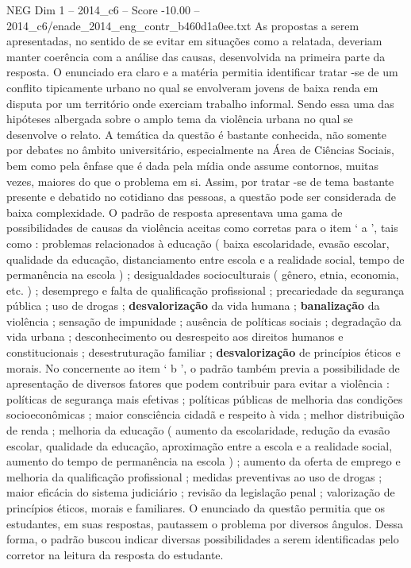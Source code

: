 \begin{textsample}{NEG Dim 1 – 2014\_c6 – Score -10.00 – 2014\_c6/enade\_2014\_eng\_contr\_b460d1a0ee.txt}
As propostas a serem apresentadas, no sentido de se evitar em situações como a relatada, deveriam manter coerência com a análise das causas, desenvolvida na primeira parte da resposta.
O enunciado era claro e a matéria permitia identificar tratar -se de um conflito tipicamente urbano no qual se envolveram jovens de baixa renda em disputa por um território onde exerciam trabalho informal.
Sendo essa uma das hipóteses albergada sobre o amplo tema da violência urbana no qual se desenvolve o relato.
A temática da questão é bastante conhecida, não somente por debates no âmbito universitário, especialmente na Área de Ciências Sociais, bem como pela ênfase que é dada pela mídia onde assume contornos, muitas vezes, maiores do que o problema em si.
Assim, por tratar -se de tema bastante presente e debatido no cotidiano das pessoas, a questão pode ser considerada de baixa complexidade.
O padrão de resposta apresentava uma gama de possibilidades de causas da violência aceitas como corretas para o item ‘ a ’, tais como : problemas relacionados à educação ( baixa escolaridade, evasão escolar, qualidade da educação, distanciamento entre escola e a realidade social, tempo de permanência na escola ) ; desigualdades socioculturais ( gênero, etnia, economia, etc. ) ; desemprego e falta de qualificação profissional ; precariedade da segurança pública ; uso de drogas ; \textbf{desvalorização} da vida humana ; \textbf{banalização} da violência ; sensação de impunidade ; ausência de políticas sociais ; degradação da vida urbana ; desconhecimento ou desrespeito aos direitos humanos e constitucionais ; desestruturação familiar ; \textbf{desvalorização} de princípios éticos e morais.
No concernente ao item ‘ b ’, o padrão também previa a possibilidade de apresentação de diversos fatores que podem contribuir para evitar a violência : políticas de segurança mais efetivas ; políticas públicas de melhoria das condições socioeconômicas ; maior consciência cidadã e respeito à vida ; melhor distribuição de renda ; melhoria da educação ( aumento da escolaridade, redução da evasão escolar, qualidade da educação, aproximação entre a escola e a realidade social, aumento do tempo de permanência na escola ) ; aumento da oferta de emprego e melhoria da qualificação profissional ; medidas preventivas ao uso de drogas ; maior eficácia do sistema judiciário ; revisão da legislação penal ; valorização de princípios éticos, morais e familiares.
O enunciado da questão permitia que os estudantes, em suas respostas, pautassem o problema por diversos ângulos.
Dessa forma, o padrão buscou indicar diversas possibilidades a serem identificadas pelo corretor na leitura da resposta do estudante.

\end{textsample}

